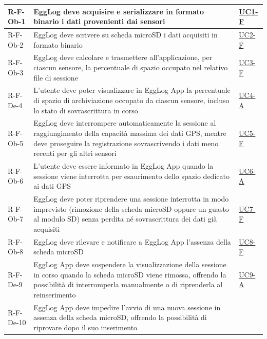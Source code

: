 \begin{center}
\begin{longtable}{|p{2cm}|p{8.5cm}|p{1.75cm}|}
    R-F-Ob-1\label{req:rf1} & EggLog deve acquisire e serializzare in formato binario i dati provenienti dai
    sensori & \hyperref[uc:uc_acquisizione_binaria]{UC1-F} \\
    \hline
    R-F-Ob-2\label{req:rf2} & EggLog deve scrivere su scheda microSD i dati acquisiti in formato binario &
    \hyperref[uc:uc_storage_binario_sd]{UC2-F} \\
    \hline
    R-F-Ob-3\label{req:rf3} & EggLog deve calcolare e trasmettere all'applicazione, per ciascun sensore, la
    percentuale di spazio occupato nel relativo file di sessione &
    \hyperref[uc:uc_calcolo_spazio]{UC3-F} \\
    \hline
    R-F-De-4\label{req:rf4} & L'utente deve poter visualizzare in EggLog App la percentuale di spazio di
    archiviazione occupato da ciascun sensore, incluso lo stato di sovrascrittura in corso &
    \hyperref[uc:uc_visualizzazione_spazio]{UC4-A} \\
    \hline
    R-F-Ob-5\label{req:rf5} & EggLog deve interrompere automaticamente la sessione al raggiungimento della
    capacità massima dei dati GPS, mentre deve proseguire la registrazione sovrascrivendo i dati
    meno recenti per gli altri sensori & \hyperref[uc:uc_gestione_capacita]{UC5-F} \\
    \hline
    R-F-Ob-6\label{req:rf6} & L'utente deve essere informato in EggLog App quando la sessione viene interrotta per
    esaurimento dello spazio dedicato ai dati GPS & \hyperref[uc:uc_notifica_blocco_gps]{UC6-A} \\
    \hline
    R-F-Ob-7\label{req:rf7} & EggLog deve poter riprendere una sessione interrotta in modo imprevisto (rimozione della
    scheda microSD oppure un guasto al modulo SD) senza perdita né sovrascrittura dei dati già
    acquisiti & \hyperref[uc:uc_recovery_sessione]{UC7-F} \\
    \hline
    R-F-Ob-8\label{req:rf8} & EggLog deve rilevare e notificare a EggLog App l'assenza della scheda microSD &
    \hyperref[uc:uc_notifica_sd_mancante]{UC8-F} \\
    \hline
    R-F-De-9\label{req:rf9} & EggLog App deve sospendere la visualizzazione della sessione in corso quando la
    scheda microSD viene rimossa, offrendo la possibilità di interromperla manualmente o di
    riprenderla al reinserimento & \hyperref[uc:uc_gestione_sd_rimossa]{UC9-A} \\
    \hline
    R-F-De-10\label{req:rf10} & EggLog App deve impedire l'avvio di una nuova sessione in assenza della scheda
    microSD, offrendo la possibilità di riprovare dopo il suo inserimento &

\end{longtable}
\end{center}
